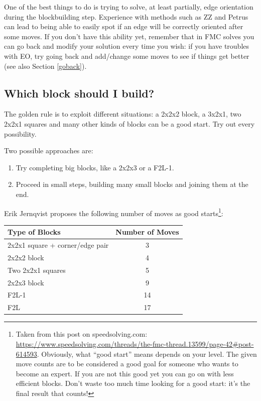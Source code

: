 \documentclass[11pt,a4paper]{book}
\begin{document}
One of the best things to do is trying to solve, at least partially, edge orientation during the blockbuilding step. Experience with methods such as ZZ and Petrus can lead to being able to easily spot if an edge will be correctly oriented after some moves. If you don't have this ability yet, remember that in FMC solves you can go back and modify your solution every time you wish: if you have troubles with EO, try going back and add/change some moves to see if things get better (see also Section \ref{goback}).


\subsection{Which block should I build?}

The golden rule is to exploit different situations: a 2x2x2 block, a 3x2x1, two 2x2x1 squares and many other kinds of blocks can be a good start. Try out every possibility.

Two possible approaches are:
\begin{enumerate}
\item Try completing big blocks, like a 2x2x3 or a F2L-1.
\item Proceed in small steps, building many small blocks and joining them at the end.
\end{enumerate}

Erik Jernqvist proposes the following number of moves as good starts\footnote{Taken from this post on speedsolving.com: \url{https://www.speedsolving.com/threads/the-fmc-thread.13599/page-42\#post-614593}. Obviously, what ``good start'' means depends on your level. The given move counts are to be considered a good goal for someone who wants to become an expert. If you are not this good yet you can go on with less efficient blocks. Don't waste too much time looking for a good start: it's the final result that counts!}:

\bigskip
\begin{center}
\begin{tabular}{|l|c|}
\hline
Type of Blocks & Number of Moves\\
\hline
2x2x1 square + corner/edge pair & 3\\
\hline
2x2x2 block & 4\\
\hline
Two 2x2x1 squares & 5\\
\hline
2x2x3 block & 9\\
\hline
F2L-1 & 14\\
\hline
F2L & 17\\
\hline
\end{tabular}
\end{center}
\end{document}
